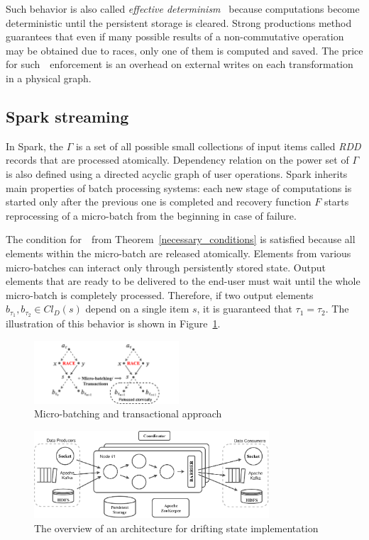 Such behavior is also called {\em effective determinism}~\cite{akidau2018streaming} because computations become deterministic until the persistent storage is cleared. Strong productions method guarantees that even if many possible results of a non-commutative operation may be obtained due to races, only one of them is computed and saved. The price for such~\eo\ enforcement is an overhead on external writes on each transformation in a physical graph.

\subsection{Spark streaming}

In Spark, the  $\Gamma$   is a set of all possible small collections of input items called  {\em RDD} records that are processed atomically.
Dependency relation on the power set of $\Gamma$ is also defined using a directed acyclic graph of user operations. 
Spark inherits main properties of batch processing systems:  each new stage of computations is started only after the previous one is completed and recovery function $F$ starts reprocessing of a micro-batch from the beginning in case of failure.

The condition for~\eo\ from Theorem~\ref{necessary_conditions} is satisfied because all elements within the micro-batch are released atomically. Elements from various micro-batches can interact only through persistently stored state. 
Output elements that are ready to be delivered to the end-user must wait until the whole micro-batch is completely processed. 
Therefore, if two output elements $b_{\tau_1},b_{\tau_2} \in Cl_D(s)$ depend on a single item $s$, it is guaranteed that $\tau_1=\tau_2$. The illustration of this behavior is shown in Figure~\ref{spark_flink}. 
 
\begin{figure}[htbp]
  \centering
  \includegraphics[width=0.48\textwidth]{pics/spark-flink}
  \caption{Micro-batching and transactional approach}
  \label{spark_flink}
\end{figure}
 
\begin{figure}[tbp]
  \centering
  \includegraphics[width=0.78\textwidth]{pics/arch.pdf}
  \caption{The overview of an architecture for drifting state implementation}
  \label {arch}
\end{figure}
 

